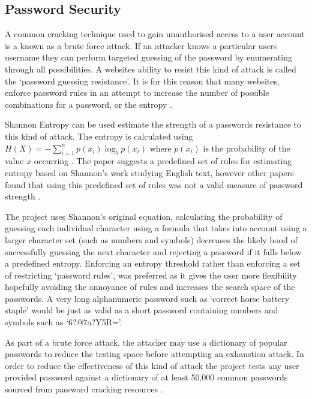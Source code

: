 \subsection{Password Security}

A common cracking technique used to gain unauthorised access to a user account is a known as a brute force attack. If an attacker knows a particular users username they can perform targeted guessing of the password by enumerating through all possibilities. A websites ability to resist this kind of attack is called the `password guessing resistance'. It is for this reason that many websites, enforce password rules in an attempt to increase the number of possible combinations for a password, or the entropy \cite{helkala2008authentication}.

Shannon Entropy can be used estimate the strength of a passwords resistance to this kind of attack. The entropy is calculated using $H(X)= -\sum_{i=1}^n{p(x_i)\log_b p(x_i)}$ where $p(x_i)$ is the probability of the value $x$ occurring \cite{burr2013electronic}.
%
The paper suggests a predefined set of rules for estimating entropy based on Shannon's work studying English text, however other papers found that using this predefined set of rules was not a valid measure of password strength \cite{weir2010shannon}.
 
The project uses Shannon's original equation, calculating the probability of guessing each individual character using a formula that takes into account using a larger character set (such as numbers and symbols) decreases the likely hood of successfully guessing the next character and rejecting a password if it falls below a predefined entropy.
%
Enforcing an entropy threshold rather than enforcing a set of restricting `password rules', was preferred as it gives the user more flexibility hopefully avoiding the annoyance of rules and increases the search space of the passwords. A very long alphanumeric password such as `correct horse battery staple' would be just as valid as a short password containing numbers and symbols such as `6?@7a?Y5R='.

As part of a brute force attack, the attacker may use a dictionary of popular passwords to reduce the testing space before attempting an exhaustion attack.
%
In order to reduce the effectiveness of this kind of attack the project tests any user provided password against a dictionary of at least 50,000 common passwords sourced from password cracking resources \cite{burr2013electronic}.

